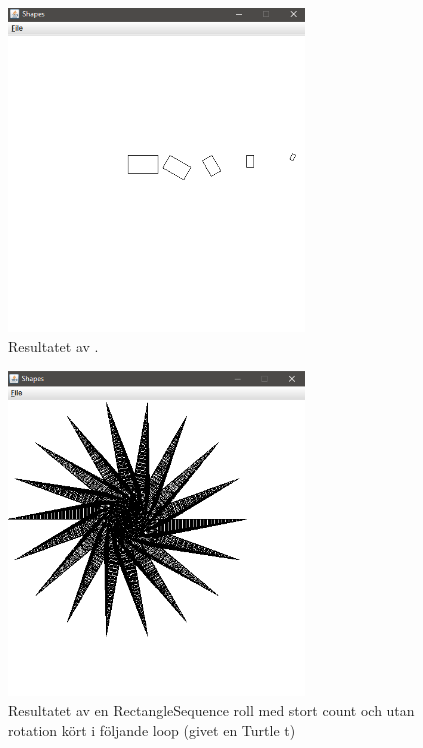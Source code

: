 \begin{figure}[H]
\centering
\includegraphics[width=0.7\textwidth]{../img/w06-lab/RollingRectangle.png}
\caption {Resultatet av .}
\label{fig:classes:turtlegraphics:rollingrectangle}
\end{figure}


\begin{figure}[H]
\centering
\includegraphics[width=0.7\textwidth]{../img/w06-lab/RectangleSequence.png}
\caption {Resultatet av en RectangleSequence roll med stort count och utan rotation kört i följande loop (givet en Turtle t) }
\label{fig:classes:turtlegraphics:rectanglesequence}
\end{figure}
